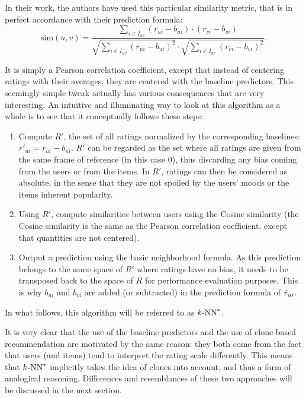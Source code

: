 In their work, the authors have used this particular similarity metric, that is
in perfect accordance with their prediction formula:
$$\text{sim}(u, v) = \frac
{ \sum\limits_{i \in I_{uv}} (r_{ui} -  b_{ui}) \cdot (r_{vi} - b_{vi})}
{\sqrt{\sum\limits_{i \in I_{uv}} (r_{ui} -  b_{ui})^2} \cdot
\sqrt{\sum\limits_{i \in I_{uv}} (r_{vi} -  b_{vi})^2}}.$$

It is simply a Pearson correlation coefficient, except that instead of
centering ratings with their averages, they are centered with the baseline
predictors. This seemingly simple tweak actually has various consequences that
are very interesting. An intuitive and illuminating way to look at this
algorithm as a whole is to see that it conceptually follows these steps:
\begin{enumerate}
  \item Compute $R'$, the set of all ratings normalized by the corresponding
    baselines: $r'_{ui} = r_{ui} - b_{ui}$.  $R'$ can be regarded as the set
    where all ratings are given from the same frame of reference (in this case
    $0$), thus
    discarding any bias coming from the users or from the items. In $R'$,
    ratings can then be considered as absolute, in the sense that they are not
    spoiled by the users' moods or the items inherent popularity.
  \item Using $R'$, compute similarities between users using the Cosine
    similarity (the Cosine similarity is the same as the Pearson correlation
    coefficient, except that quantities are not centered).
  \item Output a prediction using the basic neighborhood formula. As this
    prediction belongs to the same space of $R'$ where ratings have no bias, it
    needs to be transposed back to the space of $R$ for performance evaluation
    purposes. This is why $b_{ui}$ and $b_{vi}$ are added (or subtracted) in
    the prediction formula of $\hat{r}_{ui}$.
\end{enumerate}
\noindent
In what follows, this algorithm will be referred to as $k\text{-NN}^*$.

\noindent
It is very clear that the use of the baseline predictors and the use of
clone-based recommendation are motivated by the same reason: they both come
from the fact that users (and items) tend to interpret the rating scale
differently.  This means that $k\text{-NN}^*$ implicitly takes the idea of clones into
account, and thus a form of analogical reasoning.  Differences and resemblances
of these two approaches will be discussed in the next section.

